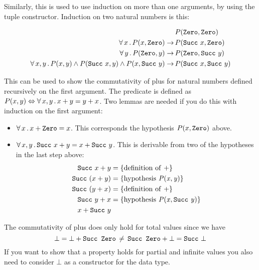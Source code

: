 Similarly, this is used to use induction on more than one arguments,
by using the tuple constructor. Induction on two natural numbers is this:

\begin{align*}
                                                                                       & P(\hs{Zero}     ,\hs{Zero}     ) \\
\fa{x} P(x,\hs{Zero})                                                   \rightarrow \, & P(\hs{Succ} \w x,\hs{Zero}     ) \\
\fa{y} P(\hs{Zero},y)                                                   \rightarrow \, & P(\hs{Zero}     ,\hs{Succ} \w y) \\
\faa{x}{y} P(x,y) \wedge P(\hs{Succ} \w x,y) \wedge P(x,\hs{Succ} \w y) \rightarrow \, & P(\hs{Succ} \w x,\hs{Succ} \w y) \\
\end{align*}

This can be used to show the commutativity of plus for natural numbers
defined recursively on the first argument. The predicate is defined as
$P(x,y) \Leftrightarrow \forall \, x , y \, . \, x + y = y + x$. Two lemmas are
needed if you do this with induction on the first argument:
\begin{itemize}
  \item $\fa{x} x + \hs{Zero} = x$. This corresponds the hypothesis
    $P(x,\hs{Zero})$ above.
  \item $\faa{x}{y} \hs{Succ} \w x + y = x + \hs{Succ} \w y$. This is
    derivable from two of the hypotheses in the last step above:
    \begin{align*}
    \hs{Succ} \w x + y   & = \{\mathrm{definition \w of \w \mathit{+}}\} \\
    \hs{Succ} \w (x + y) & = \{\mathrm{hypothesis \w \mathit{P(x,y)}}\} \\
    \hs{Succ} \w (y + x) & = \{\mathrm{definition \w of \w \mathit{+}}\} \\
    \hs{Succ} \w y + x   & = \{\mathrm{hypothesis \w \mathit{P(x,\hs{Succ} \w y)}}\} \\
    x + \hs{Succ} \w y
    \end{align*}
\end{itemize}

The commutativity of plus does only hold for total values since we have
$$\bot \eq \bot + \hs{Succ Zero} \, \neq \, \hs{Succ Zero} + \bot \eq \hs{Succ} \w \bot$$
If you want to show that a property holds for partial and infinite
values you also need to consider $\bot$ as a constructor for the data
type.

